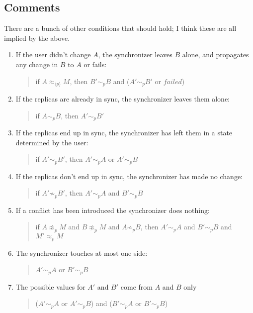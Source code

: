 \documentclass[12pt]{article}
\newcommand{\failed}{\ensuremath{\mathit{failed}}}
\newcommand{\agreeAt}[1]{\sim_{#1}}
\newcommand{\AgreeAt}[1]{\approx_{#1}}
\newcommand{\AgreeAround}[1]{\approx_{\langle #1\rangle}}
\begin{document}
\subsection{Comments}

There are a bunch of other conditions that should hold; I think these
are all implied by the above.

\begin{enumerate}
\item If the user didn't change $A$, the synchronizer leaves $B$
  alone, and propagates any change in $B$ to $A$ or fails:
  \begin{quote}
    if $A\AgreeAround{p} M$,
    then $B'\agreeAt{p} B$ and
    ($A'\agreeAt{p} B'$ or $\failed$)
  \end{quote}
  
\item If the replicas are already in sync, the synchronizer leaves
  them alone:
  \begin{quote}
    if $A\agreeAt{p} B$,
    then $A'\agreeAt{p} B'$
  \end{quote}
  
\item If the replicas end up in sync, the synchronizer has left them
  in a state determined by the user:
  \begin{quote}
    if $A'\agreeAt{p} B'$,
    then $A'\agreeAt{p} A$ or $A'\agreeAt{p} B$
  \end{quote}
  
\item If the replicas don't end up in sync, the synchronizer has made
  no change:
  \begin{quote}
    if $A'\not\agreeAt{p} B'$,
    then $A'\agreeAt{p} A$ and $B'\agreeAt{p} B$
  \end{quote}
  
\item If a conflict has been introduced the synchronizer does nothing:
  \begin{quote}
    if $A\not\AgreeAt{p} M$ and $B\not\AgreeAt{p} M$ and $A\not\agreeAt{p} B$,
    then $A'\agreeAt{p} A$ and $B'\agreeAt{p} B$ and $M'\AgreeAt{p} M$
  \end{quote}
  
\item The synchronizer touches at most one side:
  \begin{quote}
    $A'\agreeAt{p} A$ or $B'\agreeAt{p} B$
  \end{quote}
  
\item The possible values for $A'$ and $B'$ come from $A$ and $B$ only
  \begin{quote}
    ($A'\agreeAt{p} A$ or $A'\agreeAt{p} B$) and ($B'\agreeAt{p} A$ or
    $B'\agreeAt{p} B$)
  \end{quote}
\end{enumerate}
\end{document}
